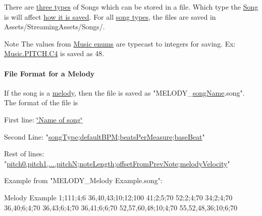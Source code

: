There are \hyperlink{group___song_enums_gae681a1f001333e39fc1cb4fea97bfe1b}{three types} of Songs which can be stored in a file. Which type the \hyperlink{class_song}{Song} is will affect \hyperlink{group___song_pub_func_ga70b0f6021c3b0590c561a88e3d1e5c2f}{how it is saved}. For all \hyperlink{group___song_enums_gae681a1f001333e39fc1cb4fea97bfe1b}{song types}, the files are saved in Assets/\+Streaming\+Assets/\+Songs/. \begin{DoxyNote}{Note}
The values from \hyperlink{group___doc_music_DocMusicEnums}{Music enums} are typecast to integers for saving. Ex\+: \hyperlink{group___music_enums_gga508f69b199ea518f935486c990edac1dab713e6323a68d3ddabf4855826c50148}{Music.\+P\+I\+T\+C\+H.\+C4} is saved as 48.
\end{DoxyNote}
\hypertarget{group___song_management_DocSongFileFormatMelody}{}\paragraph{File Format for a Melody}\label{group___song_management_DocSongFileFormatMelody}
If the song is a \hyperlink{group___song_management_DocSongMelody}{melody}, then the file is saved as "M\+E\+L\+O\+D\+Y\+\_\+\hyperlink{group___song_priv_var_ga6a5e6c1e4aa92939e2b5c1e3d9908df8}{song\+Name}.song". The format of the file is \begin{DoxyItemize}
\item First line\+: \hyperlink{group___song_priv_var_ga6a5e6c1e4aa92939e2b5c1e3d9908df8}{\char`\"{}\+Name of song\char`\"{}} \item Second Line\+: "\hyperlink{group___song_enums_gae681a1f001333e39fc1cb4fea97bfe1b}{song\+Type};\hyperlink{group___audio_DefBPM}{default\+B\+PM};\hyperlink{group___music_structs_acda79d249e7a1974a152832a881e9f0b}{beats\+Per\+Measure};\hyperlink{group___music_structs_aaf5b010a2541959c26f96630db042ee8}{base\+Beat}" \item Rest of lines\+: "\hyperlink{group___music_structs_aab23b49ea9d7961aef5091154ce45946}{pitch0,pitch1,...,pitchN};\hyperlink{group___music_structs_ac35cd02f5b3c00e3040b51e40e9e6c94}{note\+Length};\hyperlink{group___music_structs_ae281187907aed4c728c7981300dbebaf}{offset\+From\+Prev\+Note};\hyperlink{group___music_structs_a0c87d54ce8d28ea08fb4a526cb821c20}{melody\+Velocity}" \item Example from "M\+E\+L\+O\+D\+Y\+\_\+\+Melody Example.\+song"\+: \begin{DoxyVerb}Melody Example
1;111;4;6
36,40,43;10;12;100
41;2;5;70
52;2;4;70
34;2;4;70
36,40;6;4;70
36,43;6;4;70
36,41;6;6;70
52,57,60,48;10;4;70
55,52,48,36;10;6;70
\end{DoxyVerb}
\end{DoxyItemize}
